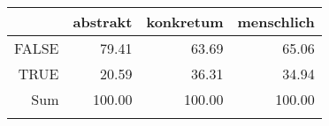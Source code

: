 \begin{tabular}{rrrr}
  \lsptoprule
 & abstrakt & konkretum & menschlich \\ 
  \midrule
FALSE & 79.41 & 63.69 & 65.06 \\ 
  TRUE & 20.59 & 36.31 & 34.94 \\ 
  Sum & 100.00 & 100.00 & 100.00 \\ 
   \lspbottomrule
\end{tabular}
